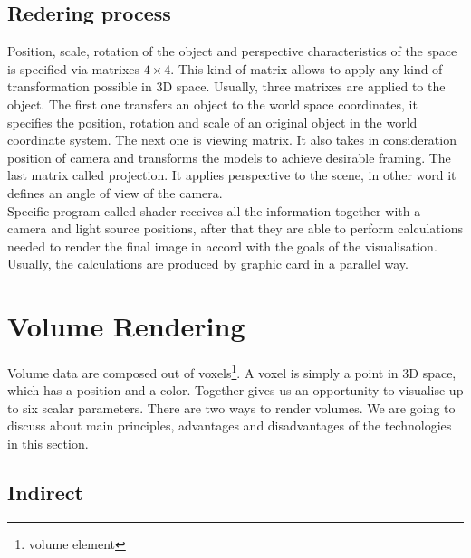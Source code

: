 \documentclass[twoside, english, 11pt]{report}
\begin{document}
\subsection{Redering process}
Position, scale, rotation of the object and perspective characteristics of the space is specified via matrixes $4\times4$. This kind of matrix allows to apply any kind of transformation possible in 3D space. Usually, three matrixes are applied to the object. The first one transfers an object to the world space coordinates, it specifies the position, rotation and scale of an original object in the world coordinate system. The next one is viewing matrix. It also takes in consideration position of camera and transforms the models to achieve desirable framing. The last matrix called projection. It applies perspective to the scene, in other word it defines an angle of view of the camera.\\


Specific program called shader receives all the information together with a camera and light source positions, after that they are able to perform calculations needed to render the final image in accord with the goals of the visualisation. Usually, the calculations are produced by graphic card in a parallel way.

\section{Volume Rendering}

Volume data are composed out of voxels\footnote{volume element}. A voxel is simply a point in 3D space, which has a position and a color. Together gives us an opportunity to visualise up to six scalar parameters. There are two ways to render volumes. We are going to discuss about main principles, advantages and disadvantages of the technologies in this section.\\

\subsection{Indirect}
\end{document}
